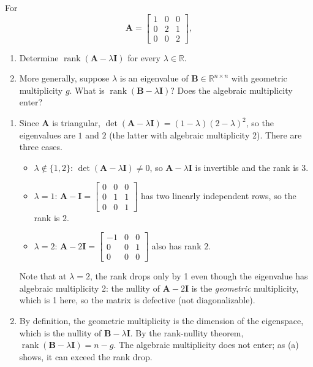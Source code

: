 \begin{exercise} %
    For
    \begin{equation*}
        \mathbf{A} = \begin{bmatrix} 1 & 0 & 0 \\ 0 & 2 & 1 \\ 0 & 0 & 2 \end{bmatrix},
    \end{equation*}
    \begin{enumerate}[label=(\alph*)]
        \item Determine $\operatorname{rank}(\mathbf{A} - \lambda \mathbf{I})$ for every $\lambda \in \mathbb{R}$.
        \item More generally, suppose $\lambda$ is an eigenvalue of $\mathbf{B} \in \mathbb{R}^{n \times n}$ with geometric multiplicity $g$. What is $\operatorname{rank}(\mathbf{B} - \lambda \mathbf{I})$? Does the algebraic multiplicity enter?
    \end{enumerate}
\end{exercise}

\begin{solution}
    \begin{enumerate}[label=(\alph*)]
        \item Since $\mathbf{A}$ is triangular, $\det(\mathbf{A} - \lambda\mathbf{I}) = (1-\lambda)(2-\lambda)^2$, so the eigenvalues are $1$ and $2$ (the latter with algebraic multiplicity 2). There are three cases.
    \begin{itemize}
        \item $\lambda \notin \{1, 2\}$: $\det(\mathbf{A} - \lambda\mathbf{I}) \neq 0$, so $\mathbf{A} - \lambda\mathbf{I}$ is invertible and the rank is $3$.
        \item $\lambda = 1$: $\mathbf{A} - \mathbf{I} = \begin{bmatrix} 0 & 0 & 0 \\ 0 & 1 & 1 \\ 0 & 0 & 1 \end{bmatrix}$ has two linearly independent rows, so the rank is $2$.
        \item $\lambda = 2$: $\mathbf{A} - 2\mathbf{I} = \begin{bmatrix} -1 & 0 & 0 \\ 0 & 0 & 1 \\ 0 & 0 & 0 \end{bmatrix}$ also has rank $2$.
    \end{itemize}
    Note that at $\lambda = 2$, the rank drops only by 1 even though the eigenvalue has algebraic multiplicity 2: the nullity of $\mathbf{A} - 2\mathbf{I}$ is the \emph{geometric} multiplicity, which is 1 here, so the matrix is defective (not diagonalizable).
        \item By definition, the geometric multiplicity is the dimension of the eigenspace, which is the nullity of $\mathbf{B} - \lambda\mathbf{I}$. By the rank-nullity theorem, $\operatorname{rank}(\mathbf{B} - \lambda\mathbf{I}) = n - g$. The algebraic multiplicity does not enter; as (a) shows, it can exceed the rank drop.
    \end{enumerate}
\end{solution}

